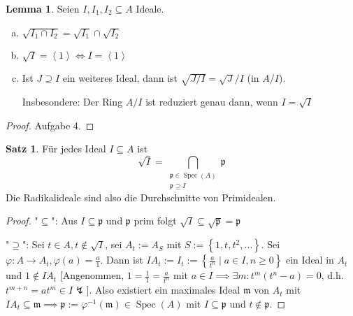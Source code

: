 \documentclass[
twoside=semi,
fontsize=12,
DIV=12, 
cleardoublepage=current,
leqno,
headings=optiontoheadandtoc, 
toc=idx
]{scrbook}
\newcommand{\bracC}[1]{\left< #1 \right>}
\newcommand{\set}[1]{\left\{ #1 \right\}}
\DeclareMathOperator{\Spec}{Spec}
\theoremstyle{definition}
\newtheorem{satz}[definition]{Satz}
\newtheorem{lemma}[definition]{Lemma}
\begin{document}
	\begin{lemma}\label{1.1.3}\hfill\newline
		Seien $I, I_1, I_2 \subseteq A$ Ideale.
		\begin{enumerate}[(a)]
			\item $\sqrt{I_1 \cap I_2} = \sqrt{I_1} \cap \sqrt{I_2}$
			
			\item $\sqrt{I} = \bracC{1} \iff I = \bracC{1}$
			
			\item Ist $J \supseteq I$ ein weiteres Ideal, dann ist $\sqrt{J/I} = \sqrt{J}/I$ (in $A/I$).
			
			\medskip\noindent
			Insbesondere: Der Ring $A/I$ ist reduziert genau dann, wenn $I = \sqrt{I}$
		\end{enumerate}
	\end{lemma}
	
	\begin{proof}
		Aufgabe 4.
	\end{proof}

	\begin{satz}\label{1.1.4}\hfill\newline
		F\"ur jedes Ideal $I \subseteq A$ ist 
			\[\sqrt{I} = \bigcap_{\substack{\mathfrak{p} \in \Spec(A)\\\mathfrak{p} \supseteq I}} \mathfrak{p}\]
		Die Radikalideale sind also die Durchschnitte von Primidealen.
	\end{satz}
	
	\begin{proof}\hfil\newline
		"$\subseteq$": Aus $I \subseteq \mathfrak{p}$ und $\mathfrak{p}$ prim folgt $\sqrt{I} \subseteq \sqrt{\mathfrak{p}} = \mathfrak{p}$
		
		\medskip\noindent
		"$\supseteq$": Sei $t \in A, t \notin \sqrt{I}$, sei $A_t := A_S$ mit $S:= \set{1,t,t^2, \dots}$.\newline
		Sei $\varphi:A \to A_t, \varphi(a) = \frac{a}{1}$. Dann ist $IA_t := I_t := \set{\frac{a}{t^n} \mid a \in I, n \geq 0}$ ein Ideal in $A_t$ und $1 \notin IA_t$ [Angenommen, $1 = \frac{1}{1} = \frac{a}{t^n}$ mit $a \in I \implies \exists m: t^m(t^n-a) = 0$, d.h. $t^{m+n} = at^m \in I \lightning$].\newline
		Also existiert ein maximales Ideal $\mathfrak{m}$ von $A_t$ mit $IA_t \subseteq \mathfrak{m} \implies \mathfrak{p} := \varphi^{-1}(\mathfrak{m}) \in \Spec(A)$ mit $I \subseteq \mathfrak{p}$ und $t \notin \mathfrak{p}$.
	\end{proof}
	
\end{document}
